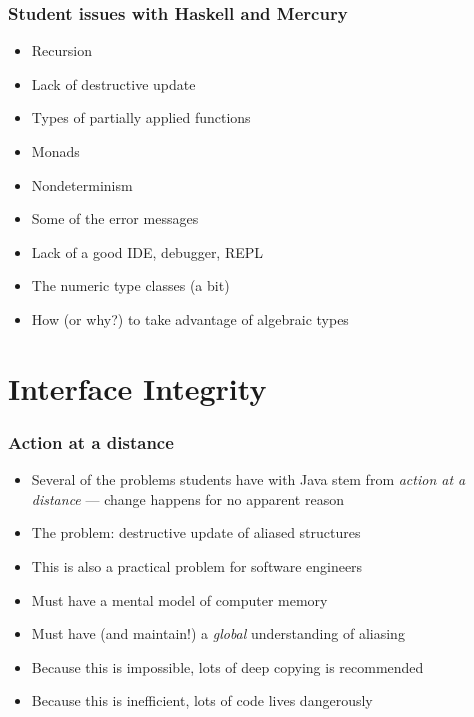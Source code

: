\documentclass[12pt]{beamer}
\begin{document}
\begin{frame}
\frametitle{Student issues with Haskell and Mercury}
\begin{itemize}
\item Recursion
\item Lack of destructive update
\item Types of partially applied functions
\item Monads
\item Nondeterminism
\item Some of the error messages
\item Lack of a good IDE, debugger, REPL
\item The numeric type classes (a bit)
\item How (or why?) to take advantage of algebraic types
\end{itemize}

\end{frame}


\section{Interface Integrity}

\begin{frame}
\frametitle{Action at a distance}
\begin{itemize}
\item Several of the problems students have with Java stem from
  \emph{action at a distance} --- change happens for no apparent reason
\item The problem:  destructive update of aliased structures
\item This is also a practical problem for software engineers
\item Must have a mental model of computer memory
\item Must have (and maintain!) a \emph{global} understanding of aliasing
\item Because this is impossible, lots of deep copying is recommended
\item Because this is inefficient, lots of code lives dangerously

\end{itemize}

\end{frame}
\end{document}
